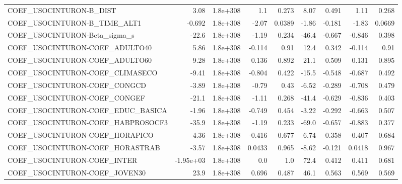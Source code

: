 \begin{tabular}{lrrrrrrrr}
COEF\_USOCINTURON-B\_DIST           &        3.08 &     1.8e+308 &     1.1 &    0.273 &       8.07 &       0.491 &         1.11 &         0.268 \\
COEF\_USOCINTURON-B\_TIME\_ALT1      &      -0.692 &     1.8e+308 &   -2.07 &   0.0389 &      -1.86 &      -0.181 &        -1.83 &        0.0669 \\
COEF\_USOCINTURON-Beta\_sigma\_s     &       -22.6 &     1.8e+308 &   -1.19 &    0.234 &      -46.4 &      -0.667 &       -0.846 &         0.398 \\
COEF\_USOCINTURON-COEF\_ADULTO40    &        5.86 &     1.8e+308 &  -0.114 &     0.91 &       12.4 &       0.342 &       -0.114 &          0.91 \\
COEF\_USOCINTURON-COEF\_ADULTO60    &        9.28 &     1.8e+308 &   0.136 &    0.892 &       21.1 &       0.509 &        0.131 &         0.895 \\
COEF\_USOCINTURON-COEF\_CLIMASECO   &       -9.41 &     1.8e+308 &  -0.804 &    0.422 &      -15.5 &      -0.548 &       -0.687 &         0.492 \\
COEF\_USOCINTURON-COEF\_CONGCD      &       -3.89 &     1.8e+308 &   -0.79 &     0.43 &      -6.52 &      -0.289 &       -0.708 &         0.479 \\
COEF\_USOCINTURON-COEF\_CONGEF      &       -21.1 &     1.8e+308 &   -1.11 &    0.268 &      -41.4 &      -0.629 &       -0.836 &         0.403 \\
COEF\_USOCINTURON-COEF\_EDUC\_BASICA &       -1.96 &     1.8e+308 &  -0.749 &    0.454 &      -3.22 &      -0.292 &       -0.663 &         0.507 \\
COEF\_USOCINTURON-COEF\_HABPROSOCF3 &       -35.9 &     1.8e+308 &   -1.19 &    0.233 &      -69.0 &      -0.657 &       -0.883 &         0.377 \\
COEF\_USOCINTURON-COEF\_HORAPICO    &        4.36 &     1.8e+308 &  -0.416 &    0.677 &       6.74 &       0.358 &       -0.407 &         0.684 \\
COEF\_USOCINTURON-COEF\_HORASTRAB   &       -3.57 &     1.8e+308 &  0.0433 &    0.965 &      -8.62 &      -0.121 &       0.0418 &         0.967 \\
COEF\_USOCINTURON-COEF\_INTER       &   -1.95e+03 &     1.8e+308 &     0.0 &      1.0 &       72.4 &       0.412 &        0.411 &         0.681 \\
COEF\_USOCINTURON-COEF\_JOVEN30     &        23.9 &     1.8e+308 &   0.696 &    0.487 &       46.1 &       0.563 &        0.569 &         0.569 \\

\end{tabular}
